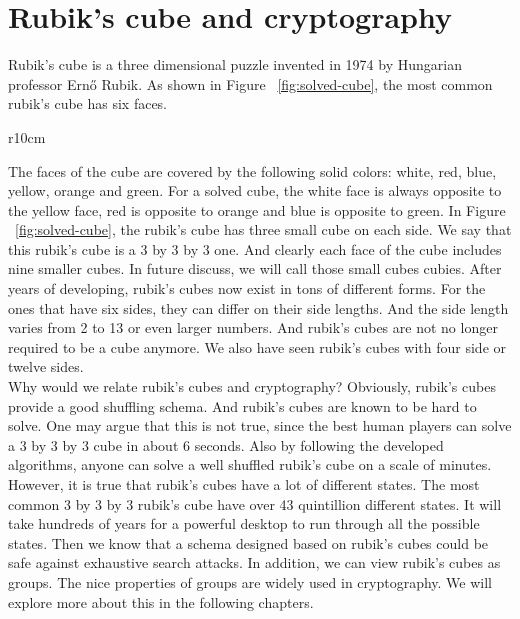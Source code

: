 \section{Rubik's cube and cryptography}
Rubik's cube is a three dimensional puzzle invented in 1974 by Hungarian professor Ernő Rubik. As shown in Figure ~\ref{fig:solved-cube}, the most common rubik's cube has six faces.
\begin{wrapfigure}{r}{10cm}
\centering
\RubikCubeSolved
{}
\caption{A rubik's cube at the solved state.}\label{fig:solved-cube}
\end{wrapfigure}
The faces of the cube are covered by the following solid colors: white, red, blue, yellow, orange and green. For a solved cube, the white face is always opposite to the yellow face, red is opposite to orange and blue is opposite to green. In Figure ~\ref{fig:solved-cube}, the rubik's cube has three small cube on each side. We say that this rubik's cube is a 3 by 3 by 3 one. And clearly each face of the cube includes nine smaller cubes. In future discuss, we will call those small cubes cubies. After years of developing, rubik's cubes now exist in tons of different forms. For the ones that have six sides, they can differ on their side lengths. And the side length varies from 2 to 13 or even larger numbers. And rubik's cubes are not no longer required to be a cube anymore. We also have seen rubik's cubes with four side or twelve sides. \\
Why would we relate rubik's cubes and cryptography? Obviously, rubik's cubes provide a good shuffling schema. And rubik's cubes are known to be hard to solve. One may argue that this is not true, since the best human players can solve a 3 by 3 by 3 cube in about 6 seconds. Also by following the developed algorithms, anyone can solve a well shuffled rubik's cube on a scale of minutes. However, it is true that rubik's cubes have a lot of different states. The most common 3 by 3 by 3 rubik's cube have over 43 quintillion different states. It will take hundreds of years for a powerful desktop to run through all the possible states. Then we know that a schema designed based on rubik's cubes could be safe against exhaustive search attacks. In addition, we can view rubik's cubes as groups. The nice properties of groups are widely used in cryptography. We will explore more about this in the following chapters.

